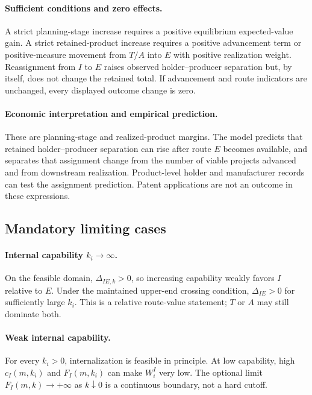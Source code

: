 \paragraph{Sufficient conditions and zero effects.}
A strict planning-stage increase requires a positive equilibrium expected-value
gain. A strict retained-product increase requires a positive advancement term
or positive-measure movement from \(T/A\) into \(E\) with positive realization
weight. Reassignment from \(I\) to \(E\) raises observed holder--producer
separation but, by itself, does not change the retained total. If advancement
and route indicators are unchanged, every displayed outcome change is zero.

\paragraph{Economic interpretation and empirical prediction.}
These are planning-stage and realized-product margins. The model predicts that
retained holder--producer separation can rise after route \(E\) becomes
available, and separates that assignment change from the number of viable
projects advanced and from downstream realization. Product-level holder and
manufacturer records can test the assignment prediction. Patent applications
are not an outcome in these expressions.

\subsection{Mandatory limiting cases}
\label{subsec:p15-boundaries}

\paragraph{Internal capability \(k_i\to\infty\).}
On the feasible domain, \(\Delta_{IE,k}>0\), so increasing capability weakly
favors \(I\) relative to \(E\). Under the maintained upper-end crossing
condition, \(\Delta_{IE}>0\) for sufficiently large \(k_i\). This is a relative
route-value statement; \(T\) or \(A\) may still dominate both.

\paragraph{Weak internal capability.}
For every \(k_i>0\), internalization is feasible in principle. At low
capability, high \(c_I(m,k_i)\) and \(F_I(m,k_i)\) can make \(W_i^I\) very
low. The optional limit \(F_I(m,k)\to+\infty\) as \(k\downarrow0\) is a
continuous boundary, not a hard cutoff.

